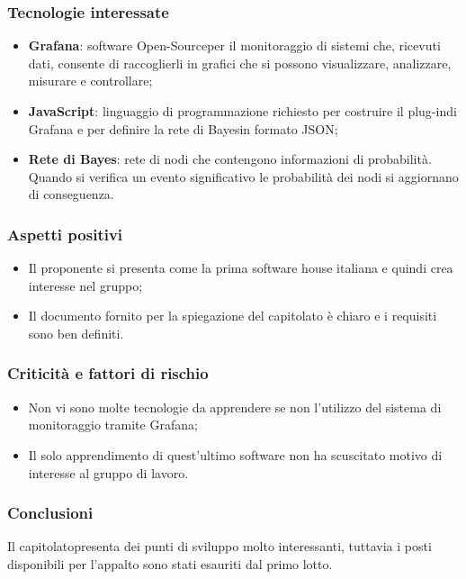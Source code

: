 \subsubsection{Tecnologie interessate}
\begin{itemize}
	\item \textbf{Grafana\glosp}: software Open-Source\glosp per il monitoraggio di sistemi che, ricevuti dati, consente di raccoglierli in grafici che si possono visualizzare, analizzare, misurare e controllare; 
	\item \textbf{JavaScript}: linguaggio di programmazione richiesto per costruire il plug-in\glo di Grafana e per definire la rete di Bayes\glosp in formato JSON\glosp;
	\item \textbf{Rete di Bayes}: rete di nodi che contengono informazioni di probabilità. Quando si verifica un evento significativo le probabilità dei nodi si aggiornano di conseguenza.
\end{itemize}
\subsubsection{Aspetti positivi}
\begin{itemize}
	\item Il proponente si presenta come la prima software house italiana e quindi crea interesse nel gruppo;
	\item Il documento fornito per la spiegazione del capitolato è chiaro e i requisiti sono ben definiti.
\end{itemize}
\subsubsection{Criticità e fattori di rischio}
\begin{itemize}
	\item Non vi sono molte tecnologie da apprendere se non l'utilizzo del sistema di monitoraggio tramite Grafana\glo;
	\item Il solo apprendimento di quest'ultimo software non ha scuscitato motivo di interesse al gruppo di lavoro.
\end{itemize}
\subsubsection{Conclusioni}
Il capitolato\glosp presenta dei punti di sviluppo molto interessanti, tuttavia i posti disponibili per l'appalto sono stati esauriti dal primo lotto.